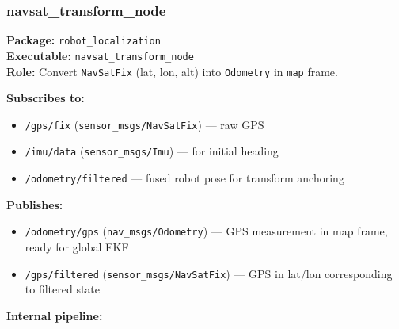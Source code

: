 \documentclass[11pt,a4paper]{article}
\begin{document}
\subsubsection{navsat\_transform\_node}

\textbf{Package:} \texttt{robot\_localization}\\
\textbf{Executable:} \texttt{navsat\_transform\_node}\\
\textbf{Role:} Convert \texttt{NavSatFix} (lat, lon, alt) into \texttt{Odometry} in \texttt{map} frame.

\textbf{Subscribes to:}
\begin{itemize}
\item \texttt{/gps/fix} (\texttt{sensor\_msgs/NavSatFix}) --- raw GPS
\item \texttt{/imu/data} (\texttt{sensor\_msgs/Imu}) --- for initial heading
\item \texttt{/odometry/filtered} --- fused robot pose for transform anchoring
\end{itemize}

\textbf{Publishes:}
\begin{itemize}
\item \texttt{/odometry/gps} (\texttt{nav\_msgs/Odometry}) --- GPS measurement in map frame, ready for global EKF
\item \texttt{/gps/filtered} (\texttt{sensor\_msgs/NavSatFix}) --- GPS in lat/lon corresponding to filtered state
\end{itemize}

\textbf{Internal pipeline:}
\end{document}
